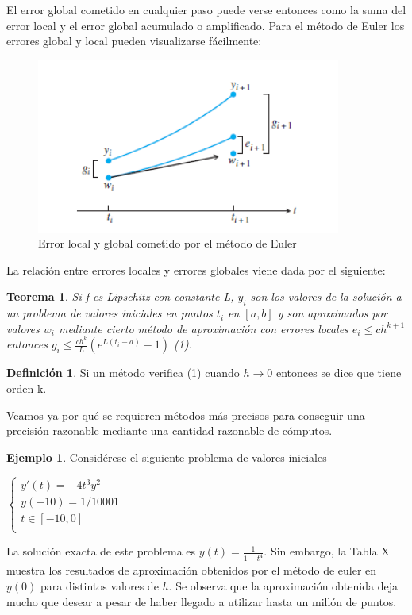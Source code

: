 \documentclass{article}
\theoremstyle{theorem-style}  %
\newtheorem{theorem}{Teorema}[section]  %
\theoremstyle{definition}
\newtheorem{definition}{Definición}[section]
\theoremstyle{example-style}
\newtheorem{example}{Ejemplo}[section]
\begin{document}
	El error global cometido en cualquier paso puede verse entonces como la suma del error local y el error global acumulado o amplificado. Para el método de Euler los errores global y local pueden visualizarse fácilmente:
	
	\begin{figure}[h]
	\centering
	\includegraphics[width=10cm]{./Images/error-euler.png}
	\caption{Error local y global cometido por el método de Euler} 
	\label{fig:error-euler}
	\end{figure}
	
	La relación entre errores locales y errores globales viene dada por el siguiente:
	
	\begin{theorem}
	Si f es Lipschitz con constante L, $y_i$ son los valores de la solución a un problema de valores iniciales en puntos $t_i$ en $[a,b]$ y son aproximados por valores $w_i$ mediante cierto método de aproximación con errores locales $e_i \leq c h^{k+1}$ entonces $g_i \le \frac{c h^k}{L} (e^{L(t_i-a)}-1)$ (1).
	\end{theorem}
	
	\begin{definition} Si un método verifica (1) cuando $h \to 0$ entonces se dice que tiene orden k.
	\end{definition}
	
	Veamos ya por qué se requieren métodos más precisos para conseguir una precisión razonable mediante una cantidad razonable de cómputos.
	
	\begin{example} Considérese el siguiente problema de valores iniciales
		\begin{center}
			$\begin{cases}
			y'(t) = -4 t^3 y^2 \\
			y(-10) = 1/10001 \\
			t \in [-10,0] \\
			\end{cases}$
		\end{center}
		La solución exacta de este problema es $y(t)=\frac{1}{1+t^4}$. Sin embargo, la Tabla X muestra los resultados de aproximación obtenidos por el método de euler en $y(0)$ para distintos valores de $h$. Se observa que la aproximación obtenida  deja mucho que desear a pesar de haber llegado a utilizar hasta un millón de puntos. 
	\end{example}
\end{document}
